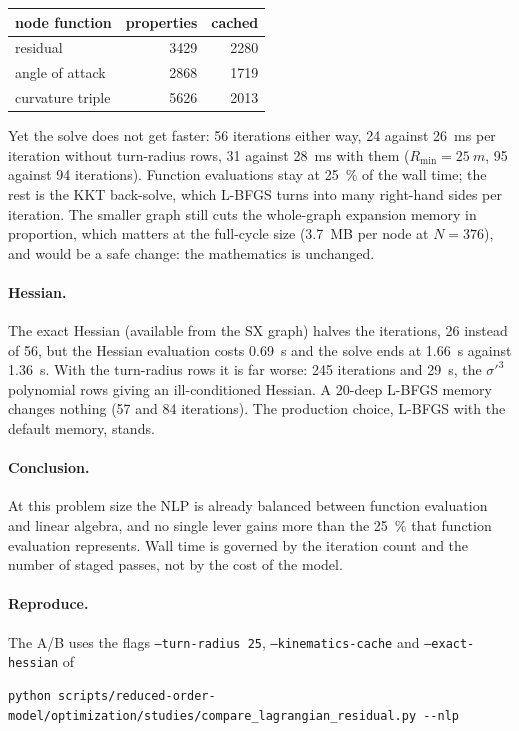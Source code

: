 \documentclass[11pt,a4paper]{article}
\newcommand{\code}[1]{\texttt{#1}}
\begin{document}
\begin{center}
\begin{tabular}{lrr}
\toprule
node function & properties & cached \\
\midrule
residual & 3429 & 2280 \\
angle of attack & 2868 & 1719 \\
curvature triple & 5626 & 2013 \\
\bottomrule
\end{tabular}
\end{center}

Yet the solve does not get faster: 56 iterations either way, 24 against
\SI{26}{ms} per iteration without turn-radius rows, 31 against \SI{28}{ms}
with them ($R_\mathrm{min} = \SI{25}{m}$, 95 against 94 iterations). Function
evaluations stay at \SI{25}{\percent} of the wall time; the rest is the KKT
back-solve, which L-BFGS turns into many right-hand sides per iteration. The
smaller graph still cuts the whole-graph expansion memory in proportion, which
matters at the full-cycle size (\SI{3.7}{MB} per node at $N = 376$), and would
be a safe change: the mathematics is unchanged.

\paragraph{Hessian.} The exact Hessian (available from the SX graph) halves the
iterations, 26 instead of 56, but the Hessian evaluation costs \SI{0.69}{s}
and the solve ends at \SI{1.66}{s} against \SI{1.36}{s}. With the turn-radius
rows it is far worse: 245 iterations and \SI{29}{s}, the $\sigma'^3$
polynomial rows giving an ill-conditioned Hessian. A 20-deep L-BFGS memory
changes nothing (57 and 84 iterations). The production choice, L-BFGS with the
default memory, stands.

\paragraph{Conclusion.} At this problem size the NLP is already balanced
between function evaluation and linear algebra, and no single lever gains
more than the \SI{25}{\percent} that function evaluation represents. Wall time
is governed by the iteration count and the number of staged passes, not by
the cost of the model.

\paragraph{Reproduce.} The A/B uses the flags \code{--turn-radius 25},
\code{--kinematics-cache} and \code{--exact-hessian} of
{\small
\begin{verbatim}
python scripts/reduced-order-model/optimization/studies/compare_lagrangian_residual.py --nlp
\end{verbatim}
}
\end{document}
